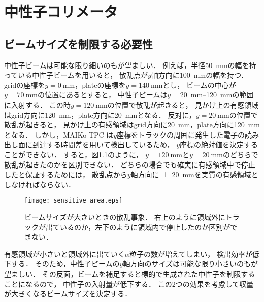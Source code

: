 \documentclass[../master]{subfiles}
\begin{document}
\chapter{中性子コリメータ}
\section{ビームサイズを制限する必要性}
中性子ビームは可能な限り細いのもが望ましい．
例えば，半径\SI{50}{\milli\metre}の幅を持っている中性子ビームを用いると，
散乱点が$y$軸方向に\SI{100}{\milli\metre}の幅を持つ．
gridの座標を$y = \SI{0}{\milli\metre}$，plateの座標を$y = \SI{140}{\milli\metre}$とし，
ビームの中心が$y = \SI{70}{\milli\metre}$の位置にあるとすると，
中性子ビームは$y = $\SIrange{20}{120}{\milli\metre}の範囲に入射する．
この時$y = \SI{120}{\milli\metre}$の位置で散乱が起きると，
見かけ上の有感領域はgrid方向に\SI{120}{\milli\metre}，plate方向に\SI{20}{\milli\metre}となる．
反対に，$y = \SI{20}{\milli\metre}$の位置で散乱が起きると，
見かけ上の有感領域はgrid方向に\SI{20}{\milli\metre}，plate方向に\SI{120}{\milli\metre}となる．
しかし，MAIKo TPC は$y$座標をトラックの周囲に発生した電子の読み出し面に到達する時間差を用いて検出しているため，
$y$座標の絶対値を決定することができない．
すると，図\ref{fig::sensitive_area}のように，
$y = \SI{120}{\milli\metre}$と$y = \SI{20}{\milli\metre}$のどちらで散乱が起きたのかを区別できない．
どちらの場合でも確実に有感領域中で停止したと保証するためには，
散乱点から$y$軸方向に\SI{\pm20}{\milli\metre}を実質の有感領域としなければならない．
\begin{figure}
  \centering
  \texttt{[image: sensitive\_area.eps]}
  \caption[ビームサイズが大きいときの散乱事象．]
          {ビームサイズが大きいときの散乱事象．
            右上のように領域外にトラックが出ているのか，左下のように領域内で停止したのか区別ができない．}
  \label{fig::sensitive_area}
\end{figure}

有感領域が小さいと領域外に出ていく$\alpha$粒子の数が増えてしまい，
検出効率が低下する．
そのため，中性子ビームの$y$軸方向のサイズは可能な限り小さいのもが望ましい．
その反面，ビームを補足すると標的で生成された中性子を制限することになるので，
中性子の入射量が低下する．
この2つの効果を考慮して収量が大きくなるビームサイズを決定する．
\end{document}
